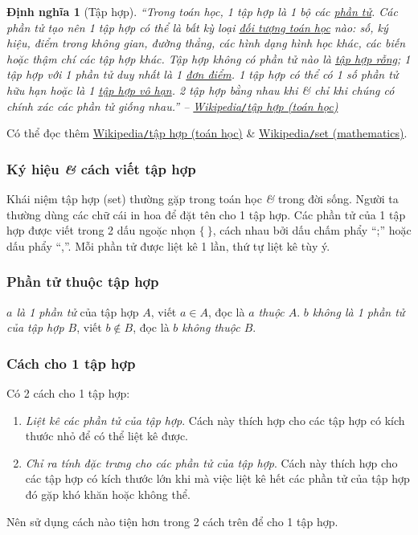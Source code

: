 \documentclass{article}
\numberwithin{equation}{section}
\newtheorem{dinhnghia}{Định nghĩa}[section]
\begin{document}
\begin{dinhnghia}[Tập hợp]
	``Trong toán học, 1 \textit{tập hợp} là 1 bộ các \href{https://vi.wikipedia.org/wiki/Ph%E1%BA%A7n_t%E1%BB%AD_(to%C3%A1n_h%E1%BB%8Dc)}{phần tử}. Các phần tử tạo nên 1 tập hợp có thể là bất kỳ loại \href{https://vi.wikipedia.org/wiki/%C4%90%E1%BB%91i_t%C6%B0%E1%BB%A3ng_to%C3%A1n_h%E1%BB%8Dc}{đối tượng toán học} nào: số, ký hiệu, điểm trong không gian, đường thẳng, các hình dạng hình học khác, các biến hoặc thậm chí các tập hợp khác. Tập hợp không có phần tử nào là \href{https://vi.wikipedia.org/wiki/T%E1%BA%ADp_h%E1%BB%A3p_r%E1%BB%97ng}{tập hợp rỗng}; 1 tập hợp với 1 phần tử duy nhất là 1 \href{https://vi.wikipedia.org/wiki/%C4%90%C6%A1n_%C4%91i%E1%BB%83m_(to%C3%A1n_h%E1%BB%8Dc)}{đơn điểm}. 1 tập hợp có thể có 1 số phần tử hữu hạn hoặc là 1 \href{https://vi.wikipedia.org/wiki/T%E1%BA%ADp_h%E1%BB%A3p_v%C3%B4_h%E1%BA%A1n}{tập hợp vô hạn}. 2 tập hợp bằng nhau khi \& chỉ khi chúng có chính xác các phần tử giống nhau.'' -- \href{https://vi.wikipedia.org/wiki/T%E1%BA%ADp_h%E1%BB%A3p_(to%C3%A1n_h%E1%BB%8Dc)}{Wikipedia\emph{\texttt{/}}tập hợp (toán học)}
\end{dinhnghia}
Có thể đọc thêm \href{https://vi.wikipedia.org/wiki/T%E1%BA%ADp_h%E1%BB%A3p_(to%C3%A1n_h%E1%BB%8Dc)}{Wikipedia\texttt{/}tập hợp (toán học)} \& \href{https://en.wikipedia.org/wiki/Set_(mathematics)}{Wikipedia\texttt{/}set (mathematics)}.

\subsubsection{Ký hiệu \textit{\&} cách viết tập hợp}
Khái niệm tập hợp (set) thường gặp trong toán học \textit{\&} trong đời sống. Người ta thường dùng các chữ cái in hoa để đặt tên cho 1 tập hợp. Các phần tử của 1 tập hợp được viết trong 2 dấu ngoặc nhọn $\{\ \}$, cách nhau bởi dấu chấm phẩy ``;'' hoặc dấu phẩy ``,''. Mỗi phần tử được liệt kê 1 lần, thứ tự liệt kê tùy ý.

\subsubsection{Phần tử thuộc tập hợp}
\textit{$a$ là 1 phần tử} của tập hợp $A$, viết $a\in A$, đọc là \textit{$a$ thuộc $A$}. \textit{$b$ không là 1 phần tử của tập hợp $B$}, viết $b\notin B$, đọc là \textit{$b$ không thuộc $B$}.

\subsubsection{Cách cho 1 tập hợp}
Có 2 cách cho 1 tập hợp:
\begin{enumerate}
	\item \textit{Liệt kê các phần tử của tập hợp}. Cách này thích hợp cho các tập hợp có kích thước nhỏ để có thể liệt kê được.
	\item \textit{Chỉ ra tính đặc trưng cho các phần tử của tập hợp}. Cách này thích hợp cho các tập hợp có kích thước lớn khi mà việc liệt kê hết các phần tử của tập hợp đó gặp khó khăn hoặc không thể. 
\end{enumerate}
Nên sử dụng cách nào tiện hơn trong 2 cách trên để cho 1 tập hợp.
\end{document}
